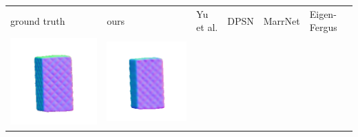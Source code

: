 \begin{center}
\begin{tabularx}{\linewidth}{@{}Y@{}Y@{}Y@{}Y@{}Y@{}Y@{}}
ground truth & ours & Yu et al. & DPSN & MarrNet & Eigen-Fergus \\
\includegraphics[width=\linewidth]{semisynthetic/20150514_18_gt.png} &
\includegraphics[width=\linewidth]{semisynthetic/20150514_18_ours_out.png} &

\end{tabularx}
\end{center}

